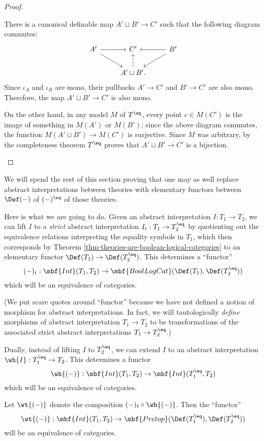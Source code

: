 \documentclass[11pt]{article}
\begin{document}
\begin{proof}
\begin{description}
There is a canonical definable map $A' \sqcup B' \to C'$ such that the following diagram commutes:
$$
\begin{tikzcd}[ampersand replacement = \&]
A' \arrow{dr} \arrow{r}  \& C' \& B' \arrow{l} \arrow{dl} \\
  \& A' \sqcup B' \arrow[dashed]{u}. \&
\end{tikzcd}
$$
Since $\iota_A$ and $\iota_B$ are mono, their pullbacks $A' \to C'$ and $B' \to C'$ are also mono. Therefore, the map $A' \sqcup B' \to C'$ is also mono.

On the other hand, in any model $M$ of $T^{\eq}$, every point $c \in M(C')$ is the image of something in $M(A')$ or $M(B')$; since the above diagram commutes, the function $M(A' \sqcup B') \to M(C')$ is surjective. Since $M$ was arbitrary, by the completeness theorem $T^{\eq}$ proves that $A' \sqcup B' \to C'$ is a bijection.
  \end{description}
\end{proof}

We will spend the rest of this section proving that one may as well replace abstract interpretations between theories with elementary functors between $\Def(-)$ of $(-)^{\eq}$ of those theories.

Here is what we are going to do. Given an abstract interpretation $I : T_1 \to T_2$, we can lift $I$ to a \emph{strict} abstract interpretation $I_t : T_1 \to T_2^{\eq}$ by quotienting out the equivalence relations interpreting the equality symbols in $T_1$, which then corresponds by Theorem \ref{thm-theories-are-boolean-logical-categories} to an elementary functor $\Def(T_1) \to \Def(T_2^{\eq})$. This determines a ``functor'' $$(-)_t : \mbf{Int}(T_1, T_2) \to \mbf{BoolLogCat}(\Def(T_1), \Def(T_2^{\eq}))$$ which will be an equivalence of categories.

(We put scare quotes around ``functor'' because we have not defined a notion of morphism for abstract interpretations. In fact, we will tautologically \emph{define} morphisms of abstract interpretation $T_1 \to T_2$ to be transformations of the associated strict abstract interpretations $T_1 \to T_2^{\eq}$.)

Dually, instead of lifting $I$ to $T_2^{\eq}$, we can extend $I$ to an abstract interpretation $\wh{I} : T_1^{\eq} \to T_2$. This determines a functor
$$
\wh{(-)} : \mbf{Int}(T_1,T_2) \to \mbf{Int}(T_1^{\eq},T_2)
$$
which will be an equivalence of categories.

Let $\wt{(-)}$ denote the composition $(-)_t \circ \wh{(-)}$. Then the ``functor''
$$
\wt{(-)} : \mbf{Int}(T_1, T_2) \to \mbf{Pretop}(\Def(T_1^{\eq}),\Def(T_2^{\eq}))
$$
will be an equivalence of categories.
\end{document}
